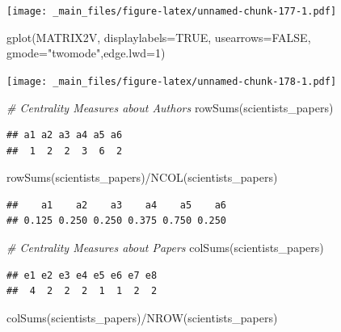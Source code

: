 \documentclass[
  notitlepage,
  onecolumn,
  openany]{book}
\newenvironment{Shaded}{\begin{snugshade}}{\end{snugshade}}
\newcommand{\AttributeTok}[1]{\textcolor[rgb]{0.77,0.63,0.00}{#1}}
\newcommand{\CommentTok}[1]{\textcolor[rgb]{0.56,0.35,0.01}{\textit{#1}}}
\newcommand{\ConstantTok}[1]{\textcolor[rgb]{0.00,0.00,0.00}{#1}}
\newcommand{\DecValTok}[1]{\textcolor[rgb]{0.00,0.00,0.81}{#1}}
\newcommand{\FunctionTok}[1]{\textcolor[rgb]{0.00,0.00,0.00}{#1}}
\newcommand{\NormalTok}[1]{#1}
\newcommand{\SpecialCharTok}[1]{\textcolor[rgb]{0.00,0.00,0.00}{#1}}
\newcommand{\StringTok}[1]{\textcolor[rgb]{0.31,0.60,0.02}{#1}}
\begin{document}
\texttt{[image: \_main\_files/figure-latex/unnamed-chunk-177-1.pdf]}

\begin{Shaded}
\begin{Highlighting}[]
\FunctionTok{gplot}\NormalTok{(MATRIX2V, }\AttributeTok{displaylabels=}\ConstantTok{TRUE}\NormalTok{, }
      \AttributeTok{usearrows=}\ConstantTok{FALSE}\NormalTok{, }\AttributeTok{gmode=}\StringTok{"twomode"}\NormalTok{,}\AttributeTok{edge.lwd=}\DecValTok{1}\NormalTok{)}
\end{Highlighting}
\end{Shaded}

\texttt{[image: \_main\_files/figure-latex/unnamed-chunk-178-1.pdf]}

\begin{Shaded}
\begin{Highlighting}[]
\CommentTok{\# Centrality Measures about Authors}
\FunctionTok{rowSums}\NormalTok{(scientists\_papers)}
\end{Highlighting}
\end{Shaded}

\begin{verbatim}
## a1 a2 a3 a4 a5 a6 
##  1  2  2  3  6  2
\end{verbatim}

\begin{Shaded}
\begin{Highlighting}[]
\FunctionTok{rowSums}\NormalTok{(scientists\_papers)}\SpecialCharTok{/}\FunctionTok{NCOL}\NormalTok{(scientists\_papers)}
\end{Highlighting}
\end{Shaded}

\begin{verbatim}
##    a1    a2    a3    a4    a5    a6 
## 0.125 0.250 0.250 0.375 0.750 0.250
\end{verbatim}

\begin{Shaded}
\begin{Highlighting}[]
\CommentTok{\# Centrality Measures about Papers}
\FunctionTok{colSums}\NormalTok{(scientists\_papers)}
\end{Highlighting}
\end{Shaded}

\begin{verbatim}
## e1 e2 e3 e4 e5 e6 e7 e8 
##  4  2  2  2  1  1  2  2
\end{verbatim}

\begin{Shaded}
\begin{Highlighting}[]
\FunctionTok{colSums}\NormalTok{(scientists\_papers)}\SpecialCharTok{/}\FunctionTok{NROW}\NormalTok{(scientists\_papers)}
\end{Highlighting}
\end{Shaded}
\end{document}
